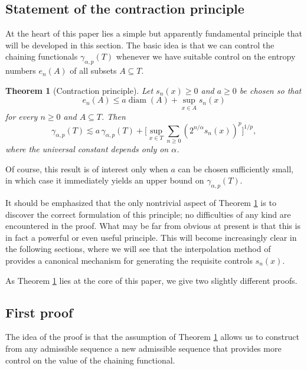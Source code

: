 \documentclass[10pt,reqno]{amsart}
\newtheorem{thm}{Theorem}[section]
\theoremstyle{definition}
\numberwithin{equation}{section}
\numberwithin{figure}{section}
\numberwithin{table}{section}
\newcommand{\diam}{\mathop{\mathrm{diam}}}
\begin{document}
\subsection{Statement of the contraction principle}

At the heart of this paper lies a simple but apparently fundamental 
principle that will be developed in this section. The basic idea is that 
we can control the chaining functionals $\gamma_{\alpha,p}(T)$ whenever we 
have suitable control on the entropy numbers $e_n(A)$ of all subsets 
$A\subseteq T$.

\begin{thm}[Contraction principle]
\label{thm:contr}
Let $s_n(x)\ge 0$ and $a\ge 0$ be chosen so that
$$
	e_n(A) \le a\diam(A) + \sup_{x\in A}s_n(x)
$$
for every $n\ge 0$ and $A\subseteq T$. Then
$$
	\gamma_{\alpha,p}(T) \lesssim
	a\,\gamma_{\alpha,p}(T) +
	\Bigg[\sup_{x\in T}
	\sum_{n\ge 0}(2^{n/\alpha}s_n(x))^p
	\Bigg]^{1/p},
$$
where the universal constant depends only on $\alpha$.
\end{thm}

Of course, this result is of interest only when $a$ can be chosen 
sufficiently small, in which case it immediately yields an upper bound on 
$\gamma_{\alpha,p}(T)$.

It should be emphasized that the only nontrivial aspect of Theorem 
\ref{thm:contr} is to discover the correct formulation of this principle; 
no difficulties of any kind are encountered in the proof. What may be 
far from obvious at present is that this is in fact a powerful or even 
useful principle. This will become increasingly clear in the following 
sections, where we will see that the interpolation method of \cite{vH16a} 
provides a canonical mechanism for generating the requisite controls 
$s_n(x)$.

As Theorem \ref{thm:contr} lies at the core of this paper, we give 
two slightly different proofs.


\subsection{First proof}

The idea of the proof is that the assumption of Theorem \ref{thm:contr} 
allows us to construct from any admissible sequence a new admissible 
sequence that provides more control on the value of the chaining 
functional.
\end{document}
